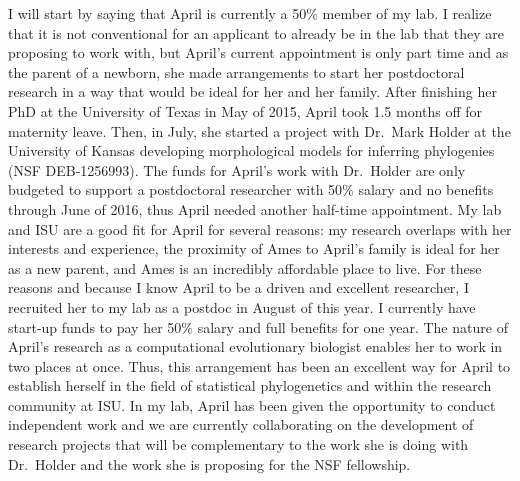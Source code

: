 \documentclass[11pt]{article}
\begin{document}
I will start by saying that April is currently a 50\% member of my lab. 
I realize that it is not conventional for an applicant to already be in the lab that they are proposing to work with, but April's current appointment is only part time and as the parent of a newborn, she made arrangements to start her postdoctoral research in a way that would be ideal for her and her family. 
After finishing her PhD at the University of Texas in May of 2015, April took 1.5 months off for maternity leave.
Then, in July, she started a project with Dr.\ Mark Holder at the University of Kansas developing morphological models for inferring phylogenies (NSF DEB-1256993). 
The funds for April's work with Dr.\ Holder are only budgeted to support a postdoctoral researcher with 50\% salary and no benefits through June of 2016, thus April needed another half-time appointment.
My lab and ISU are a good fit for April for several reasons: my research overlaps with her interests and experience, the proximity of Ames to April's family is ideal for her as a new parent, and Ames is an incredibly affordable place to live. 
For these reasons and because I know April to be a driven and excellent researcher, I recruited her to my lab as a postdoc in August of this year.
I currently have start-up funds to pay her 50\% salary and full benefits for one year.  
The nature of April's research as a computational evolutionary biologist enables her to work in two places at once. Thus, this arrangement has been an excellent way for April to establish herself in the field of statistical phylogenetics and within the research community at ISU. 
In my lab, April has been given the opportunity to conduct independent work and we are currently collaborating on the development of research projects that will be complementary to the work she is doing with Dr.\ Holder and the work she is proposing for the NSF fellowship.
\end{document}
